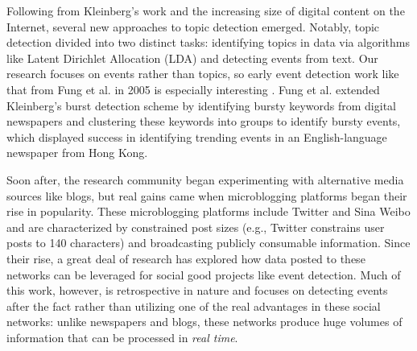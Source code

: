 \documentclass[letterpaper]{article}
\begin{document}
Following from Kleinberg's work and the increasing size of digital content on the Internet, several new approaches to topic detection emerged.
Notably, topic detection divided into two distinct tasks: identifying topics in data via algorithms like Latent Dirichlet Allocation (LDA) \cite{blei2003latent} and detecting events from text.
Our research focuses on events rather than topics, so early event detection work like that from Fung et al. in 2005 is especially interesting \cite{Fung:2005:PFB:1083592.1083616}.
Fung et al. extended Kleinberg's burst detection scheme by identifying bursty keywords from digital newspapers and clustering these keywords into groups to identify bursty events, which displayed success in identifying trending events in an English-language newspaper from Hong Kong.



Soon after, the research community began experimenting with alternative media sources like blogs, but real gains came when microblogging platforms began their rise in popularity.
These microblogging platforms include Twitter and Sina Weibo and are characterized by constrained post sizes (e.g., Twitter constrains user posts to 140 characters) and broadcasting publicly consumable information.
Since their rise, a great deal of research has explored how data posted to these networks can be leveraged for social good projects like event detection.
Much of this work, however, is retrospective in nature and focuses on detecting events after the fact rather than utilizing one of the real advantages in these social networks: unlike newspapers and blogs, these networks produce huge volumes of information that can be processed in \emph{real time}.
\end{document}
